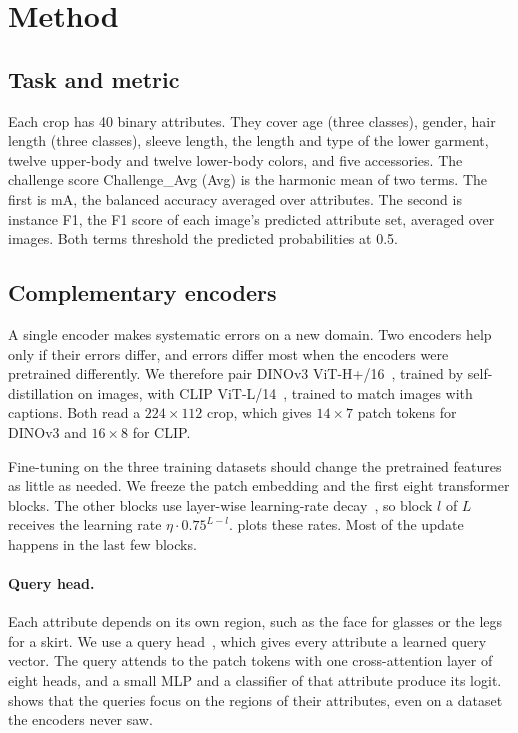 \documentclass[10pt,twocolumn,letterpaper]{article}
\begin{document}
\section{Method}
\label{sec:method}

\subsection{Task and metric}
\label{sec:task}

Each crop has 40 binary attributes. They cover age (three classes), gender, hair length (three classes), sleeve length, the length and type of the lower garment, twelve upper-body and twelve lower-body colors, and five accessories. The challenge score Challenge\_Avg (Avg) is the harmonic mean of two terms. The first is mA, the balanced accuracy averaged over attributes. The second is instance F1, the F1 score of each image's predicted attribute set, averaged over images. Both terms threshold the predicted probabilities at 0.5.

\subsection{Complementary encoders}
\label{sec:encoders}

A single encoder makes systematic errors on a new domain. Two encoders help only if their errors differ, and errors differ most when the encoders were pretrained differently. We therefore pair DINOv3 ViT-H+/16~\cite{dinov3}, trained by self-distillation on images, with CLIP ViT-L/14~\cite{clip}, trained to match images with captions. Both read a $224\times112$ crop, which gives $14\times7$ patch tokens for DINOv3 and $16\times8$ for CLIP.

Fine-tuning on the three training datasets should change the pretrained features as little as needed. We freeze the patch embedding and the first eight transformer blocks. The other blocks use layer-wise learning-rate decay~\cite{beit}, so block $l$ of $L$ receives the learning rate $\eta\cdot0.75^{L-l}$.  plots these rates. Most of the update happens in the last few blocks.

\paragraph{Query head.} Each attribute depends on its own region, such as the face for glasses or the legs for a skirt. We use a query head~\cite{q2l,mldecoder}, which gives every attribute a learned query vector. The query attends to the patch tokens with one cross-attention layer of eight heads, and a small MLP and a classifier of that attribute produce its logit.  shows that the queries focus on the regions of their attributes, even on a dataset the encoders never saw.
\end{document}
